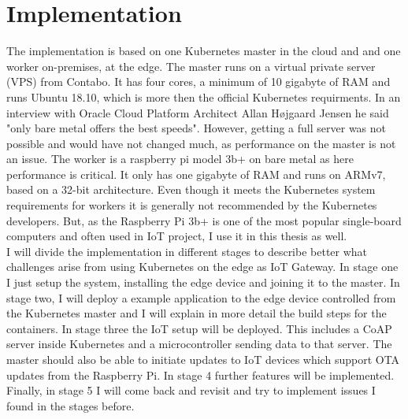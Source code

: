 \clearpage
\section{Implementation} \label{sec:implementation}
The implementation is based on one Kubernetes master in the cloud and and one worker on-premises, at the edge. The master runs on a virtual private server (VPS) from Contabo\cite{online:ContaboWebsite}. 
It has four cores, a minimum of 10 gigabyte of RAM and runs Ubuntu 18.10, which is more then the official Kubernetes requirments\cite{kubernetesRequirementsInstall:online}. 
In an interview with Oracle Cloud Platform Architect Allan H{\o}jgaard Jensen he said "only bare metal offers the best speeds". However, getting a full server was not possible and would have not changed much, as performance on the master is not an issue. The worker is a raspberry pi model 3b+ on bare metal as here performance is critical. 
It only has one gigabyte of RAM and runs on ARMv7, based on a 32-bit architecture. Even though it meets the Kubernetes system requirements for workers it is generally not recommended by the Kubernetes developers. But, as the Raspberry Pi 3b+ is one of the most popular single-board computers and often used in IoT project, I use it in this thesis as well.\\
I will divide the implementation in different stages to describe better what challenges arise from using Kubernetes on the edge as IoT Gateway. In stage one I just setup the system, installing the edge device and joining it to the master. In stage two, I will deploy a example application to the edge device controlled from the Kubernetes master and I will explain in more detail the build steps for the containers. In stage three the IoT setup will be deployed. This includes a CoAP server inside Kubernetes and a microcontroller sending data to that server. The master should also be able to initiate updates to IoT devices which support OTA updates from the Raspberry Pi. In stage 4 further features will be implemented. Finally, in stage 5 I will come back and revisit and try to implement issues I found in the stages before.\\











